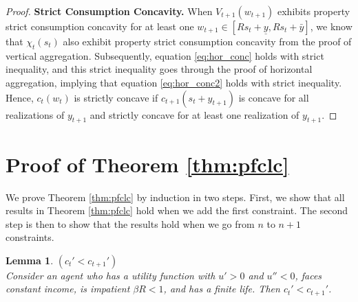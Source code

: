 \documentclass[titlepage]{\econtex}
\newtheorem{lemma}{Lemma}
\begin{document}
\begin{proof}
	\bigskip
	\noindent \textbf{Strict Consumption Concavity.}
	When $V_{t+1}(w_{t+1})$ exhibits property strict consumption concavity for at least one $w_{t+1} \in [Rs_t + \underline{y}, Rs_t + \bar{y}]$, we know that $\chi_t(s_t)$ also exhibit property strict consumption concavity from the proof of vertical aggregation. Subsequently, equation \eqref{eq:hor_conc} holds with strict inequality, and this strict inequality goes through the proof of horizontal aggregation, implying that equation \eqref{eq:hor_conc2} holds with strict inequality. Hence, $c_t(w_t)$ is strictly concave if $c_{t+1}(s_t + {y}_{t+1})$ is concave for all realizations of ${y}_{t+1}$ and strictly concave for at least one realization of ${y}_{t+1}$. 
\end{proof}


\section{Proof of Theorem \ref{thm:pfclc}}\label{app:pfclc}
	We prove Theorem \ref{thm:pfclc} by induction in two steps. First, we show that all results in Theorem \ref{thm:pfclc} hold when we add the first constraint. The second step is then to show that the results hold when we go from $n$ to $n+1$ constraints. 
	
	
	\begin{lemma}\textit{$(c_{t}' < c_{t+1}')$} \\
		Consider an agent who has a utility function with $u' > 0$ and $u'' < 0$, faces constant income, is impatient $\beta R < 1$, and has a finite life. Then $c_{t}' < c_{t+1}'$.
	\end{lemma}
	
\end{document}
